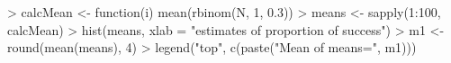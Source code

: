 \begin{Schunk}
\begin{Sinput}
> calcMean <- function(i) mean(rbinom(N, 1, 0.3))
> means <- sapply(1:100, calcMean)
> hist(means, xlab = "estimates of proportion of success")
> m1 <- round(mean(means), 4)
> legend("top", c(paste("Mean of means=", m1)))
\end{Sinput}
\end{Schunk}
